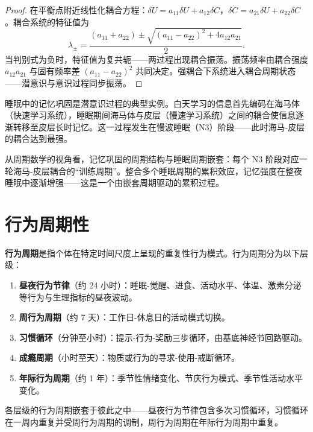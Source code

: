 \begin{proof}
在平衡点附近线性化耦合方程：$\delta \dot U = a_{11}\delta U + a_{12}\delta C$，$\delta \dot C = a_{21}\delta U + a_{22}\delta C$。耦合系统的特征值为
\[
\lambda_{\pm} = \frac{(a_{11}+a_{22}) \pm \sqrt{(a_{11}-a_{22})^2 + 4 a_{12} a_{21}}}{2}.
\]
当判别式为负时，特征值为复共轭——两过程出现耦合振荡。振荡频率由耦合强度 $a_{12}a_{21}$ 与固有频率差 $(a_{11}-a_{22})^2$ 共同决定。强耦合下系统进入耦合周期状态——潜意识与意识过程同步振荡。
\end{proof}

\begin{example}[睡眠中的记忆巩固]\label{ex:sleep_memory_consolidation}
睡眠中的记忆巩固是潜意识过程的典型实例。白天学习的信息首先编码在海马体（快速学习系统），睡眠期间海马体与皮层（慢速学习系统）之间的耦合使信息逐渐转移至皮层长时记忆。这一过程发生在慢波睡眠（N3）阶段——此时海马-皮层的耦合达到最强。

从周期数学的视角看，记忆巩固的周期结构与睡眠周期嵌套：每个 N3 阶段对应一轮海马-皮层耦合的“训练周期”。整合多个睡眠周期的累积效应，记忆强度在整夜睡眠中逐渐增强——这是一个由嵌套周期驱动的累积过程。
\end{example}

\section{行为周期性}

\begin{definition}[行为周期]\label{def:behaviour_periodicity}
\textbf{行为周期}是指个体在特定时间尺度上呈现的重复性行为模式。行为周期分为以下层级：
\begin{enumerate}[label=(\roman*)]
    \item \textbf{昼夜行为节律}（约 24 小时）：睡眠-觉醒、进食、活动水平、体温、激素分泌等行为与生理指标的昼夜波动。
    \item \textbf{周行为周期}（约 7 天）：工作日-休息日的活动模式切换。
    \item \textbf{习惯循环}（分钟至小时）：提示-行为-奖励三步循环，由基底神经节回路驱动。
    \item \textbf{成瘾周期}（小时至天）：物质或行为的寻求-使用-戒断循环。
    \item \textbf{年际行为周期}（约 1 年）：季节性情绪变化、节庆行为模式、季节性活动水平变化。
\end{enumerate}
各层级的行为周期嵌套于彼此之中——昼夜行为节律包含多次习惯循环，习惯循环在一周内重复并受周行为周期的调制，周行为周期在年际行为周期中重复。
\end{definition}


